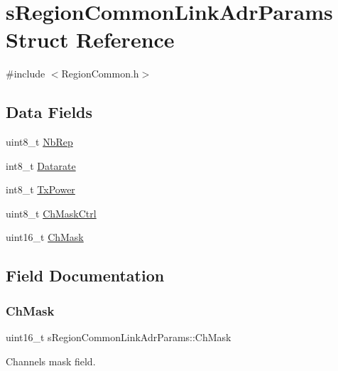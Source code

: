 \hypertarget{structsRegionCommonLinkAdrParams}{}\section{s\+Region\+Common\+Link\+Adr\+Params Struct Reference}
\label{structsRegionCommonLinkAdrParams}


{\ttfamily \#include $<$Region\+Common.\+h$>$}

\subsection*{Data Fields}
\begin{DoxyCompactItemize}
\item 
uint8\+\_\+t \hyperlink{structsRegionCommonLinkAdrParams_a2b8f075b875504269639472a92f0d209}{Nb\+Rep}
\item 
int8\+\_\+t \hyperlink{structsRegionCommonLinkAdrParams_ad98fd10c2350b2904f9b6476b83047c2}{Datarate}
\item 
int8\+\_\+t \hyperlink{structsRegionCommonLinkAdrParams_abff516206c93b038001dcb98629b53c2}{Tx\+Power}
\item 
uint8\+\_\+t \hyperlink{structsRegionCommonLinkAdrParams_a8f65bfcf50d2fe6113780d060aa75ee7}{Ch\+Mask\+Ctrl}
\item 
uint16\+\_\+t \hyperlink{structsRegionCommonLinkAdrParams_aa953b9ff7101e6bd891f9fc516bbd51a}{Ch\+Mask}
\end{DoxyCompactItemize}


\subsection{Field Documentation}
\mbox{\label{structsRegionCommonLinkAdrParams_aa953b9ff7101e6bd891f9fc516bbd51a}} 
\subsubsection{\texorpdfstring{Ch\+Mask}{ChMask}}
{\footnotesize\ttfamily uint16\+\_\+t s\+Region\+Common\+Link\+Adr\+Params\+::\+Ch\+Mask}

Channels mask field. \mbox{\label{structsRegionCommonLinkAdrParams_a8f65bfcf50d2fe6113780d060aa75ee7}} 

